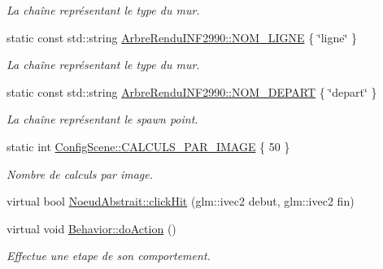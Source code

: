 \begin{DoxyCompactItemize}
\begin{DoxyCompactList}\small\item\em La chaîne représentant le type du mur. \end{DoxyCompactList}\item 
\hypertarget{group__inf2990_ga776d72e2b41b06f1992ba48b1ed3de0b}{static const std\-::string \hyperlink{group__inf2990_ga776d72e2b41b06f1992ba48b1ed3de0b}{Arbre\-Rendu\-I\-N\-F2990\-::\-N\-O\-M\-\_\-\-L\-I\-G\-N\-E} \{ \char`\"{}ligne\char`\"{} \}}\label{group__inf2990_ga776d72e2b41b06f1992ba48b1ed3de0b}

\begin{DoxyCompactList}\small\item\em La chaîne représentant le type du mur. \end{DoxyCompactList}\item 
\hypertarget{group__inf2990_ga7f23ccbd07f9afea9685f108c4053834}{static const std\-::string \hyperlink{group__inf2990_ga7f23ccbd07f9afea9685f108c4053834}{Arbre\-Rendu\-I\-N\-F2990\-::\-N\-O\-M\-\_\-\-D\-E\-P\-A\-R\-T} \{ \char`\"{}depart\char`\"{} \}}\label{group__inf2990_ga7f23ccbd07f9afea9685f108c4053834}

\begin{DoxyCompactList}\small\item\em La chaîne représentant le spawn point. \end{DoxyCompactList}\item 
\hypertarget{group__inf2990_gadb487b450a0314a5d1f75cf31ce502eb}{static int \hyperlink{group__inf2990_gadb487b450a0314a5d1f75cf31ce502eb}{Config\-Scene\-::\-C\-A\-L\-C\-U\-L\-S\-\_\-\-P\-A\-R\-\_\-\-I\-M\-A\-G\-E} \{ 50 \}}\label{group__inf2990_gadb487b450a0314a5d1f75cf31ce502eb}

\begin{DoxyCompactList}\small\item\em Nombre de calculs par image. \end{DoxyCompactList}\end{DoxyCompactItemize}
\begin{DoxyCompactItemize}
\item 
virtual bool \hyperlink{group__inf2990_gad1d1a9c6adcedfcd5eda6c6d4e67a50f}{Noeud\-Abstrait\-::click\-Hit} (glm\-::ivec2 debut, glm\-::ivec2 fin)
\end{DoxyCompactItemize}
\begin{DoxyCompactItemize}
\item 
virtual void \hyperlink{group__inf2990_gac22f205bc85075ff707ad1f695c18439}{Behavior\-::do\-Action} ()
\begin{DoxyCompactList}\small\item\em Effectue une etape de son comportement. \end{DoxyCompactList}\end{DoxyCompactItemize}


